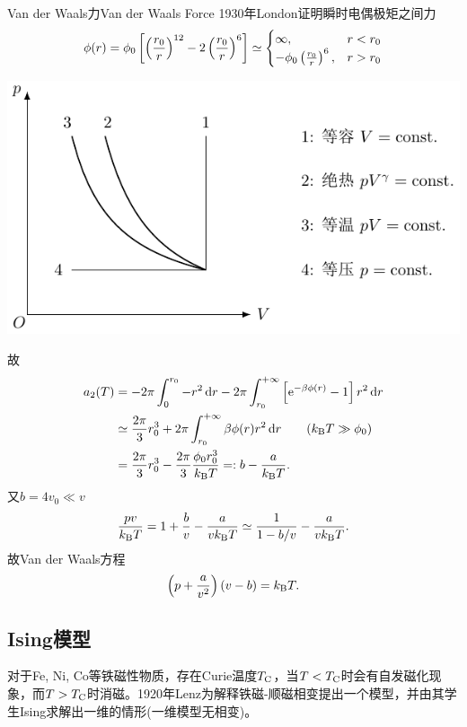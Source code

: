 \begin{example}{Van der Waals力}{Van der Waals Force}
	1930年London证明瞬时电偶极矩之间力
	\begin{equation}
		\phi(r)=\phi_0\left[\left(\frac{r_0}r\right)^{12}-2\left(\frac{r_0}r\right)^6\right]\simeq\begin{cases}
			\infty,&r<r_0\\
			-\phi_0\left(\frac{r_0}r\right)^6,&r>r_0
		\end{cases}
	\end{equation}
	\begin{center}
		\includegraphics[page=25]{figures/tikz/coordinates.pdf}
		\label{fig:phi(r)}
	\end{center}
	故
	{\begin{align*}
		a_2(T)&=-2\pi\int_0^{r_0}-r^2\d r-2\pi\int_{r_0}^{+\infty}\fkh{\e{-\beta\phi(r)}-1}r^2\d r\\
		&\simeq\frac{2\pi}3r_0^3+2\pi\int_{r_0}^{+\infty}\beta\phi(r)r^2\d r\tag{$\kB T\gg\phi_0$}\\
		&=\frac{2\pi}3r_0^3-\frac{2\pi}3\frac{\phi_0r_0^3}{\kB T}=:b-\frac a{\kB T}.
	\end{align*}}
	又$b=4v_0\ll v$
	\[
		\frac{pv}{k_{\mathrm B} T}=1+\frac bv-\frac a{vk_{\mathrm B} T}\simeq\frac1{1-b/v}-\frac a{vk_{\mathrm B} T}.
	\]
	故Van der Waals方程
	\begin{align}
		\left(p+\frac a{v^2}\right)(v-b)=k_{\mathrm B} T.
	\end{align}
\end{example}

\subsection{Ising模型}

对于Fe, Ni, Co等铁磁性物质，存在Curie温度$T_\mathrm C$，当$T<T_\mathrm C$时会有自发磁化现象，而$T>T_\mathrm C$时消磁。1920年Lenz为解释铁磁-顺磁相变提出一个模型，并由其学生Ising求解出一维的情形(一维模型无相变)。

